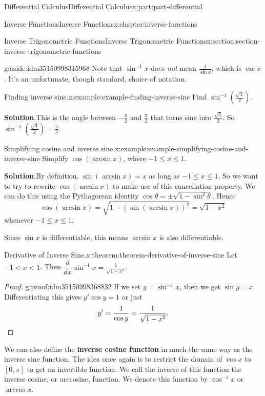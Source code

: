 \documentclass[twoside,10pt,]{book}
\newcommand{\blocktitlefont}{\relax}
\newcommand{\terminology}[1]{\textbf{#1}}
\numberwithin{equation}{part}
\newcommand{\qedhere}{\relax}
\newcommand{\dv}[3][]{\dfrac{d^{#1} #2}{d #3^{#1}}}
\begin{document}
\begin{partptx}{Differential Calculus}{}{Differential Calculus}{}{}{x:part:part-differential}
\begin{chapterptx}{Inverse Functions}{}{Inverse Functions}{}{}{x:chapter:inverse-functions}
\begin{sectionptx}{Inverse Trigonometric Functions}{}{Inverse Trigonometric Functions}{}{}{x:section:section-inverse-trigonometric-functions}
\begin{aside}{}{g:aside:idm35150998315968}
Note that \(\sin^{-1}x\) does \emph{not} mean \(\frac{1}{\sin x}\), which is \(\csc x\). It's an unfortunate, though standard, choice of notation.%
\end{aside}
%
\begin{example}{Finding inverse sine.}{x:example:example-finding-inverse-sine}%
Find \(\sin^{-1}(\frac{\sqrt{3}}{2})\).%
\par\smallskip%
\noindent\textbf{\blocktitlefont Solution}.\hypertarget{g:solution:idm35150998312512}{}\quad{}This is the angle between \(-\frac{\pi}{2}\) and \(\frac{\pi}{2}\) that turns sine into \(\frac{\sqrt{3}}{2}\). So \(\sin^{-1}(\frac{\sqrt{3}}{2}) = \frac{\pi}{3}\).%
\end{example}
\begin{example}{Simplifying cosine and inverse sine.}{x:example:example-simplifying-cosine-and-inverse-sine}%
Simplify \(\cos(\arcsin x)\), where \(-1\leq x\leq 1\).%
\par\smallskip%
\noindent\textbf{\blocktitlefont Solution}.\hypertarget{g:solution:idm35150998308800}{}\quad{}By definition, \(\sin(\arcsin x) = x\) as long as \(-1\leq x\leq 1\). So we want to try to rewrite \(\cos(\arcsin x)\) to make use of this cancellation property. We can do this using the Pythagorean identity \(\cos \theta = \pm\sqrt{1-\sin^{2}\theta}\). Hence%
\begin{equation*}
\cos(\arcsin x) = \sqrt{1-(\sin(\arcsin x))^{2}} = \sqrt{1 - x^{2}}
\end{equation*}
whenever \(-1\leq x\leq 1\).%
\end{example}
Since \(\sin x\) is differentiable, this means \(\arcsin x\) is also differentiable.%
\begin{theorem}{Derivative of Inverse Sine.}{}{x:theorem:theorem-derivative-of-inverse-sine}%
Let \(-1 < x < 1\). Then \(\dv{}{x}\sin^{-1}x = \frac{1}{\sqrt{1-x^{2}}}\).%
\end{theorem}
\begin{proof}{}{g:proof:idm35150998368832}
If we set \(y = \sin^{-1}x\), then we get \(\sin y = x\). Differentiating this gives \(y'\cos y = 1\) or just%
\begin{equation*}
y' = \frac{1}{\cos y} = \frac{1}{\sqrt{1-x^{2}}}.\qedhere
\end{equation*}
%
\end{proof}
We can also define the \terminology{inverse cosine function} in much the same way as the inverse sine function. The idea once again is to restrict the domain of \(\cos x\) to \([0,\pi]\) to get an invertible function. We call the inverse of this function the inverse cosine, or arccosine, function. We denote this function by \(\cos^{-1}x\) or \(\arccos x\).%

\end{sectionptx}
\end{chapterptx}
\end{partptx}
\end{document}
